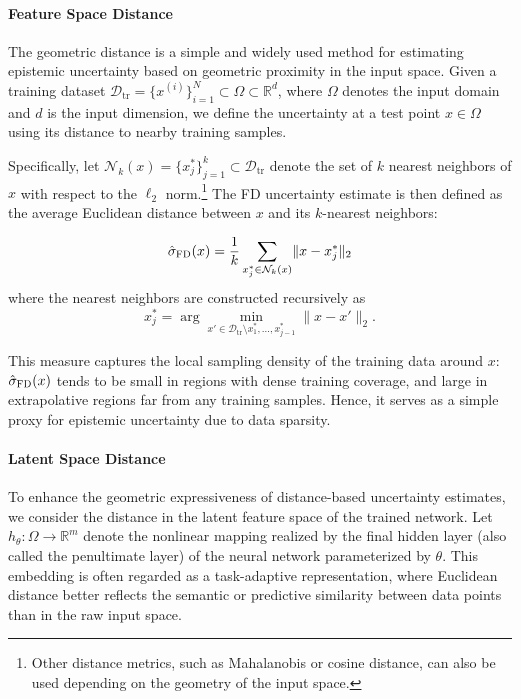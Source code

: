 \documentclass[preprint,12pt]{elsarticle}
\begin{document}
\paragraph{Feature Space Distance}

The geometric distance is a simple and widely used method for estimating epistemic uncertainty based on geometric proximity in the input space. Given a training dataset $\mathcal D_{\mathrm{tr}} = \{x^{(i)}\}_{i=1}^{N} \subset \Omega \subset \mathbb{R}^{d}$, where $\Omega$ denotes the input domain and $d$ is the input dimension, we define the uncertainty at a test point $x \in \Omega$ using its distance to nearby training samples.

Specifically, let $\mathcal{N}_k(x) = \{x_j^\ast\}_{j=1}^k \subset \mathcal D_{\mathrm{tr}}$ denote the set of $k$ nearest neighbors of $x$ with respect to the $\ell_2$ norm.\footnote{Other distance metrics, such as Mahalanobis or cosine distance, can also be used depending on the geometry of the input space.} The FD uncertainty estimate is then defined as the average Euclidean distance between $x$ and its $k$-nearest neighbors:

\begin{equation}
\hat\sigma_{\textsc{FD}}(x)
= \frac{1}{k} \sum_{x_j^\ast \in \mathcal N_k(x)} \lVert x - x_j^\ast \rVert_2
\label{eq:fd_hu}
\end{equation}
where the nearest neighbors are constructed recursively as
\begin{equation}
x_j^\ast = \arg\min_{x' \in \mathcal D_{\mathrm{tr}} \setminus {x_1^\ast, \dots, x_{j-1}^\ast}} \lVert x - x' \rVert_2.
\end{equation}

This measure captures the local sampling density of the training data around $x$: $\hat\sigma_{\textsc{FD}}(x)$ tends to be small in regions with dense training coverage, and large in extrapolative regions far from any training samples. Hence, it serves as a simple proxy for epistemic uncertainty due to data sparsity.

\paragraph{Latent Space Distance} To enhance the geometric expressiveness of distance-based uncertainty estimates, we consider the distance in the latent feature space of the trained network. Let $h_{\theta} \colon \Omega \to \mathbb{R}^{m}$ denote the nonlinear mapping realized by the final hidden layer (also called the penultimate layer) of the neural network parameterized by $\theta$. This embedding is often regarded as a task-adaptive representation, where Euclidean distance better reflects the semantic or predictive similarity between data points than in the raw input space.
\end{document}
